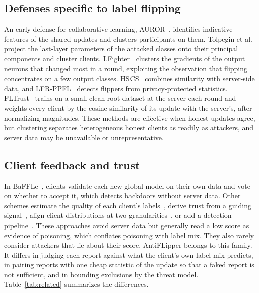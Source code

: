 \documentclass[journal]{IEEEtran}
\begin{document}
\subsection{Defenses specific to label flipping}
An early defense for collaborative learning, AUROR~\cite{shen2016auror}, identifies indicative features of the shared updates and clusters participants on them. Tolpegin et al.~\cite{tolpegin2020data} project the last-layer parameters of the attacked classes onto their principal components and cluster clients. LFighter~\cite{jebreel2024lfighter} clusters the gradients of the output neurons that changed most in a round, exploiting the observation that flipping concentrates on a few output classes. HSCS~\cite{li2023hscs} combines similarity with server-side data, and LFR-PPFL~\cite{shen2024lfrppfl} detects flippers from privacy-protected statistics. FLTrust~\cite{cao2020fltrust} trains on a small clean root dataset at the server each round and weights every client by the cosine similarity of its update with the server's, after normalizing magnitudes. These methods are effective when honest updates agree, but clustering separates heterogeneous honest clients as readily as attackers, and server data may be unavailable or unrepresentative.

\subsection{Client feedback and trust}
In BaFFLe~\cite{andreina2021baffle}, clients validate each new global model on their own data and vote on whether to accept it, which detects backdoors without server data. Other schemes estimate the quality of each client's labels~\cite{jiang2023dataquality,ovi2023confident}, derive trust from a guiding signal~\cite{li2025flgt}, align client distributions at two granularities~\cite{fedalign2026}, or add a detection pipeline~\cite{abroshan2025aitoprotect}. These approaches avoid server data but generally read a low score as evidence of poisoning, which conflates poisoning with label mix. They also rarely consider attackers that lie about their score. AntiFLipper belongs to this family. It differs in judging each report against what the client's own label mix predicts, in pairing reports with one cheap statistic of the update so that a faked report is not sufficient, and in bounding exclusions by the threat model. Table~\ref{tab:related} summarizes the differences.
\end{document}
